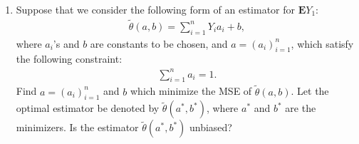 \documentclass[11pt]{article}
\begin{document}
\begin{enumerate}
\begin{enumerate}
	\item  Suppose that we consider the following form of an estimator for $\mathbf{E}Y_1$:
\begin{eqnarray*}
	\tilde \theta(a,b) =  \sum_{i=1}^n Y_i a_i + b,
\end{eqnarray*}
where $a_i$'s and $b$ are constants to be chosen, and $a=(a_i)_{i=1}^n$, which satisfy the following constraint:
\begin{eqnarray*}
	 \sum_{i=1}^n a_i = 1.
\end{eqnarray*}
Find $a = (a_i)_{i=1}^n$ and $b$ which minimize the MSE of $\tilde \theta(a,b)$. Let the optimal estimator be denoted by $\tilde \theta(a^*,b^*)$, where $a^*$ and $b^*$ are the minimizers. Is the estimator $\tilde \theta(a^*,b^*)$ unbiased?


\end{enumerate}
\end{enumerate}
\end{document}
